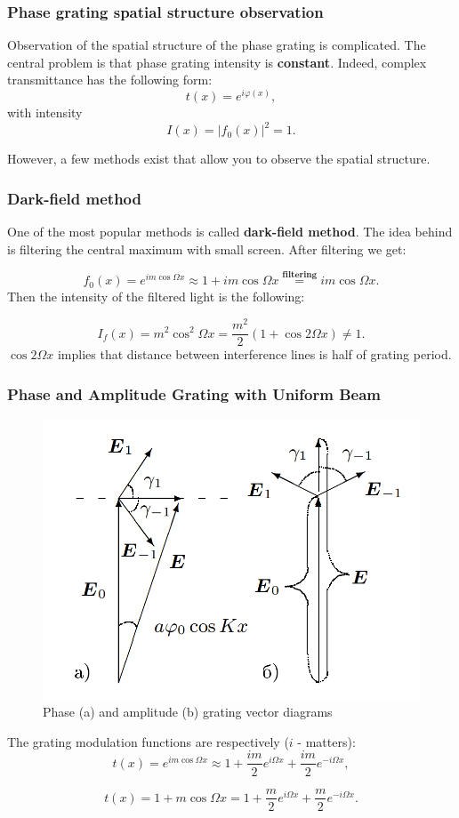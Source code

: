 \documentclass{beamer}
\begin{document}
	\begin{frame}
		\frametitle{Phase grating spatial structure observation}
		
				Observation of the spatial structure of the phase grating is complicated. The central problem is that phase grating intensity is \textbf{constant}. Indeed, complex transmittance has the following form:
				$$t(x) = e^{i\varphi(x)},$$ with intensity
				$$I(x) = |f_0(x)|^2 = 1.$$
				
				However, a few methods exist that allow you to observe the spatial structure.

	\end{frame}

	\begin{frame}
		\frametitle{Dark-field method}
		
		One of the most popular methods is called \textbf{dark-field method}. The idea behind is filtering the central maximum with small screen. After filtering we get:
		
		\begin{equation*}
				f_0(x) = e^{i m \cos{\Omega x}} \approx 1 +  i m \cos{\Omega x} \overset{\textbf{filtering}}{=}  i m \cos{\Omega x}.
		\end{equation*}
		Then the intensity of the filtered light is the following:
		
		\begin{equation*}
				I_f(x) = m^2 \cos^2{\Omega x} = \frac{m^2}{2} (1 + \cos{2 \Omega x}) \neq 1.
				\label{eq:dark_field}
		\end{equation*}
		$\cos{2 \Omega x}$ implies that distance between interference lines is half of grating period.
	
	\end{frame}

	\begin{frame}
		\frametitle{Phase and Amplitude Grating with Uniform Beam}
		
		\begin{figure}
			\centering
			\includegraphics[width=0.5\linewidth]{res/amplitude_phase_grating}
			\caption{Phase (a) and amplitude (b) grating vector diagrams}
			\label{fig:amplitudephasegrating}
		\end{figure}
		
		The grating modulation functions are respectively ($i$ - matters):
		$$	t(x) = e^{i m \cos \Omega x} \approx 1 + \frac{im}{2}e^{i \Omega x} + \frac{im}{2}e^{-i \Omega x},$$
		
		$$	t(x) = 1 + m \cos{\Omega x} = 1 + \frac{m}{2}e^{i \Omega x} + \frac{m}{2}e^{-i \Omega x}. $$
	
	\end{frame}	
\end{document}
